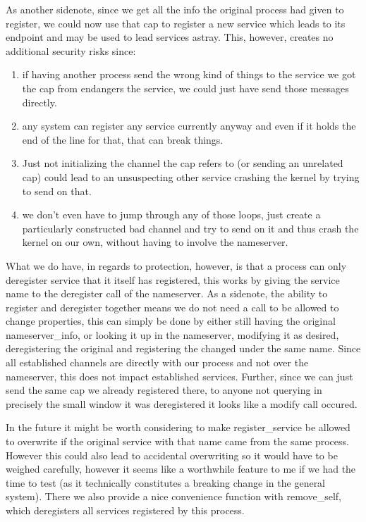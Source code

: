 As another sidenote, since we get all the info the original process had given to register, we could now use that cap to register a new service which leads to its endpoint and may be used to lead services astray. This, however, creates no additional security risks since:
\begin{enumerate}
	\item if having another process send the wrong kind of things to the service we got the cap from endangers the service, we could just have send those messages directly.
	\item any system can register any service currently anyway and even if it holds the end of the line for that, that can break things.
	\item Just not initializing the channel the cap refers to (or sending an unrelated cap) could lead to an unsuspecting other service crashing the kernel by trying to send on that.
	\item we don't even have to jump through any of those loops, just create a particularly constructed bad channel and try to send on it and thus crash the kernel on our own, without having to involve the nameserver.
\end{enumerate}
What we do have, in regards to protection, however, is that a process can only deregister service that it itself has registered, this works by giving the service name to the deregister call of the nameserver. As a sidenote, the ability to register and deregister together means we do not need a call to be allowed to change properties, this can simply be done by either still having the original nameserver\_info, or looking it up in the nameserver, modifying it as desired, deregistering the original and registering the changed under the same name. Since all established channels are directly with our process and not over the nameserver, this does not impact established services. Further, since we can just send the same cap we already registered there, to anyone not querying in precisely the small window it was deregistered it looks like a modify call occured.
\medskip

In the future it might be worth considering to make register\_service be allowed to overwrite if the original service with that name came from the same process. However this could also lead to accidental overwriting so it would have to be weighed carefully, however it seems like a worthwhile feature to me if we had the time to test (as it technically constitutes a breaking change in the general system).
There we also provide a nice convenience function with remove\_self, which deregisters all services registered by this process.\\
\medskip

